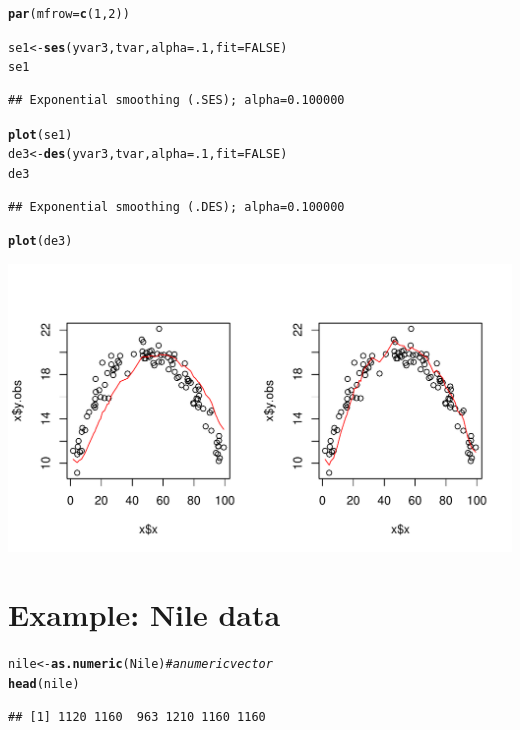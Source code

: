 \documentclass[10pt]{article}\usepackage[]{graphicx}\usepackage[]{color}
\makeatletter
\def\maxwidth{ %
  \ifdim\Gin@nat@width>\linewidth
    \linewidth
  \else
    \Gin@nat@width
  \fi
}
\newcommand{\hlnum}[1]{\textcolor[rgb]{0.686,0.059,0.569}{#1}}%
\newcommand{\hlcom}[1]{\textcolor[rgb]{0.678,0.584,0.686}{\textit{#1}}}%
\newcommand{\hlstd}[1]{\textcolor[rgb]{0.345,0.345,0.345}{#1}}%
\newcommand{\hlkwb}[1]{\textcolor[rgb]{0.69,0.353,0.396}{#1}}%
\newcommand{\hlkwc}[1]{\textcolor[rgb]{0.333,0.667,0.333}{#1}}%
\newcommand{\hlkwd}[1]{\textcolor[rgb]{0.737,0.353,0.396}{\textbf{#1}}}%
\newenvironment{kframe}{%
 \def\at@end@of@kframe{}%
 \ifinner\ifhmode%
  \def\at@end@of@kframe{\end{minipage}}%
  \begin{minipage}{\columnwidth}%
 \fi\fi%
 \def\FrameCommand##1{\hskip\@totalleftmargin \hskip-\fboxsep
 \colorbox{shadecolor}{##1}\hskip-\fboxsep
     \hskip-\linewidth \hskip-\@totalleftmargin \hskip\columnwidth}%
 \MakeFramed {\advance\hsize-\width
   \@totalleftmargin\z@ \linewidth\hsize
   \@setminipage}}%
 {\par\unskip\endMakeFramed%
 \at@end@of@kframe}
\newenvironment{knitrout}{}{} %
\makeatother
\begin{document}
\begin{knitrout}
\color{fgcolor}\begin{kframe}
\begin{alltt}
\hlkwd{par}\hlstd{(}\hlkwc{mfrow}\hlstd{=}\hlkwd{c}\hlstd{(}\hlnum{1}\hlstd{,}\hlnum{2}\hlstd{))}

\hlstd{se1}  \hlkwb{<-} \hlkwd{ses}\hlstd{(yvar3, tvar,} \hlkwc{alpha}\hlstd{=}\hlnum{.1}\hlstd{,} \hlkwc{fit}\hlstd{=}\hlnum{FALSE}\hlstd{)}
\hlstd{se1}
\end{alltt}
\begin{verbatim}
## Exponential smoothing (.SES); alpha=0.100000
\end{verbatim}
\begin{alltt}
\hlkwd{plot}\hlstd{(se1)}
\hlstd{de3}  \hlkwb{<-} \hlkwd{des}\hlstd{(yvar3, tvar,} \hlkwc{alpha}\hlstd{=}\hlnum{.1}\hlstd{,} \hlkwc{fit}\hlstd{=}\hlnum{FALSE}\hlstd{)}
\hlstd{de3}
\end{alltt}
\begin{verbatim}
## Exponential smoothing (.DES); alpha=0.100000
\end{verbatim}
\begin{alltt}
\hlkwd{plot}\hlstd{(de3)}
\end{alltt}
\end{kframe}
\includegraphics[width=\maxwidth]{fig/graphunnamed-chunk-5-1} 

\end{knitrout}


\section{Example: Nile data}
\label{example:nile}

\begin{knitrout}
\color{fgcolor}\begin{kframe}
\begin{alltt}
\hlstd{nile} \hlkwb{<-} \hlkwd{as.numeric}\hlstd{(Nile)} \hlcom{# a numeric vector}
\hlkwd{head}\hlstd{(nile)}
\end{alltt}
\begin{verbatim}
## [1] 1120 1160  963 1210 1160 1160
\end{verbatim}
\end{kframe}
\end{knitrout}
\end{document}
